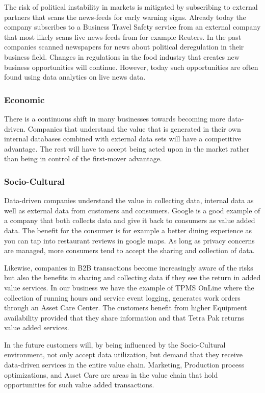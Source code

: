 \documentclass[10pt]{article} %
\begin{document}
The risk of political instability in markets is mitigated by subscribing to external partners that scans the news-feeds for early warning signs. Already today the company subscribes to a Business Travel Safety service from an external company that most likely scans live news-feeds from for example Reuters. In the past companies scanned newspapers for news about political deregulation in their business field. Changes in regulations in the food industry that creates new business opportunities will continue. However, today such opportunities are often found using data analytics on live news data.

\subsubsection{Economic}
There is a continuous shift in many businesses towards becoming more data-driven. Companies that understand the value that is generated in their own internal databases combined with external data sets will have a competitive advantage. The rest will have to accept being acted upon in the market rather than being in control of the first-mover advantage.

\subsubsection{Socio-Cultural}
Data-driven companies understand the value in collecting data, internal data as well as external data from customers and consumers. Google is a good example of a company that both collects data and give it back to consumers as value added data. The benefit for the consumer is for example a better dining experience as you can tap into restaurant reviews in google maps. As long as privacy concerns are managed, more consumers tend to accept the sharing and collection of data.

Likewise, companies in B2B transactions become increasingly aware of the risks but also the benefits in sharing and collecting data if they see the return in added value services. In our business we have the example of TPMS OnLine where the collection of running hours and service event logging, generates work orders through an Asset Care Center. The customers benefit from higher Equipment availability provided that they share information and that Tetra Pak returns value added services. 

In the future customers will, by being influenced by the Socio-Cultural environment, not only accept data utilization, but demand that they receive data-driven services in the entire value chain. Marketing, Production process optimizations, and Asset Care are areas in the value chain that hold opportunities for such value added transactions.
\end{document}
